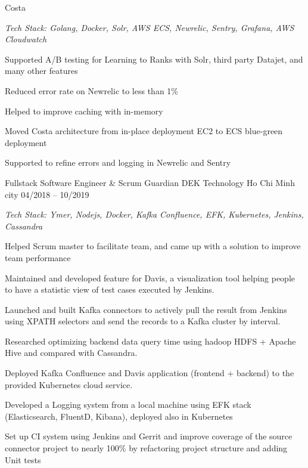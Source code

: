 \begin{cventries}
     \cventry
    {Costa} %
    {} %
    {} %
    {} %
    {
      \begin{cvitems} %
        \item[] {\it Tech Stack: Golang, Docker, Solr, AWS ECS, Newrelic, Sentry, Grafana, AWS Cloudwatch}
        \item {Supported A/B testing for Learning to Ranks with Solr, third party Datajet, and many other features}
        \item {Reduced error rate on Newrelic to less than 1\%}
        \item {Helped to improve caching with in-memory}
        \item {Moved Costa architecture from in-place deployment EC2 to ECS blue-green deployment}
        \item {Supported to refine errors and logging in Newrelic and Sentry}
      \end{cvitems}
    }

  \cventry
    {Fullstack Software Engineer \& Scrum Guardian} %
    {DEK Technology} %
    {Ho Chi Minh city} %
    {04/2018 -- 10/2019} %
    {
      \begin{cvitems} %
        \item[] {\it Tech Stack: Ymer, Nodejs, Docker, Kafka Confluence, EFK, Kubernetes, Jenkins, Cassandra}
        \item {Helped Scrum master to facilitate team, and came up with a solution to improve team performance}
        \item {Maintained and developed feature for Davis, a visualization tool helping people to have a statistic view of test cases executed by Jenkins.  }
        \item {Launched and built Kafka connectors to actively pull the result from Jenkins using XPATH selectors and send the records to a Kafka cluster by interval.}
        \item {Researched optimizing backend data query time using hadoop HDFS + Apache Hive and compared with Cassandra.}
        \item {Deployed Kafka Confluence and Davis application (frontend + backend) to the provided Kubernetes cloud service.}
        \item {Developed a Logging system from a local machine using EFK stack (Elasticsearch, FluentD, Kibana), deployed also in Kubernetes}
        \item {Set up CI system using Jenkins and Gerrit and improve coverage of the source connector project to nearly 100\% by refactoring project structure and adding Unit tests}
      \end{cvitems}
    }


\end{cventries}
